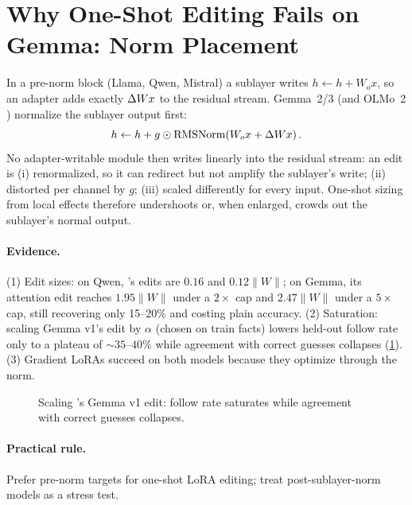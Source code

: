 \section{Why One-Shot Editing Fails on Gemma: Norm Placement}
\label{sec:analysis}

In a pre-norm block (Llama, Qwen, Mistral) a sublayer writes $h \leftarrow h + W_o x$, so an adapter adds exactly
$\Delta W x$ to the residual stream. Gemma~2/3 \citep{gemma3} (and OLMo~2 \citep{olmo2}) normalize the sublayer output first:
\begin{equation}
  h \leftarrow h + g \odot \mathrm{RMSNorm}\!\left(W_o x + \Delta W x\right).
\end{equation}
No adapter-writable module then writes linearly into the residual stream: an edit is (i) renormalized, so it can
redirect but not amplify the sublayer's write; (ii) distorted per channel by $g$; (iii) scaled differently for every
input. One-shot sizing from local effects therefore undershoots or, when enlarged, crowds out the sublayer's normal
output.

\paragraph{Evidence.} (1) Edit sizes: on Qwen, \astra{}'s edits are $0.16$ and $0.12\lVert W\rVert$; on Gemma, its
attention edit reaches $1.95\lVert W\rVert$ under a $2\times$ cap and $2.47\lVert W\rVert$ under a $5\times$ cap, still
recovering only 15--20\% and costing plain accuracy. (2) Saturation: scaling Gemma v1's edit by $\alpha$ (chosen on
train facts) lowers held-out follow rate only to a plateau of ${\sim}35$--$40\%$ while agreement with correct guesses
collapses (\cref{fig:scale}). (3) Gradient LoRAs succeed on both models because they optimize through the norm.

\begin{figure}[t]
\centering
{}
\caption{Scaling \astra{}'s Gemma v1 edit: follow rate saturates while agreement with correct guesses collapses.}
\label{fig:scale}
\end{figure}

\paragraph{Practical rule.} Prefer pre-norm targets for one-shot LoRA editing; treat post-sublayer-norm models as a
stress test. 
